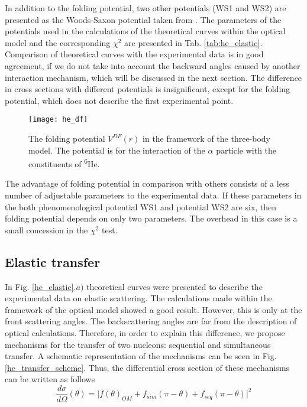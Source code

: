 \documentclass[
12pt, %
oneside, %
english, %
onehalfspacing, %
onehalfspacing, %
headsepline, %
]{MastersDoctoralThesis} %
\newcommand{\he}{\textsuperscript{6}He\xspace}
\begin{document}
In addition to the folding potential, two other potentials (WS1 and WS2) are presented as the Woods-Saxon potential taken from \cite{oganessian1999dynamics}. The parameters of the potentials used in the calculations of the theoretical curves within the optical model and the corresponding $ \chi^2 $ are presented in Tab. \ref{tab:he_elastic}.
Comparison of theoretical curves with the experimental data is in good agreement, if we do not take into account the backward angles caused by another interaction mechanism, which will be discussed in the next section. The difference in cross sections with different potentials is insignificant, except for the folding potential, which does not describe the first experimental point. 

\begin{figure}[tp]
\centering
\texttt{[image: he\_df]}
\decoRule
\caption{  \footnotesize  The folding potential $V^{DF}(r)$ in the framework of the three-body model. The potential is for the interaction of the $\alpha$ particle with the constituents of \he.
}
\label{he_df}
\end{figure}

The advantage of folding potential in comparison with others consists of a less number of adjustable parameters to the experimental data. If these parameters in the  both phenomenological potential WS1 and potential WS2 are six, then folding potential depends on only two parameters. The overhead in this case is a small concession in the $ \chi^2$ test.



\subsection{Elastic transfer}
In Fig. \ref{he_elastic}.$a)$ theoretical curves were presented to describe the experimental data on elastic scattering. The calculations made within the framework of the optical model showed a good result. However, this is only at the front scattering angles. The backscattering angles are far from the description of optical calculations. Therefore, in order to explain this difference, we propose mechanisms for the transfer of two nucleons: sequential and simultaneous transfer. A schematic representation of the mechanisms can be seen in Fig. \ref{he_transfer_scheme}.  Thus, the differential cross section of these mechanisms can be written as follows
\begin{equation}
\dfrac{d\sigma}{d\Omega}(\theta) =
 \vert f(\theta)_{OM} + f_{sim}(\pi - \theta)+ f_{seq}(\pi - \theta)  \vert^2
\label{eq:he_cs}
\end{equation}
\end{document}
